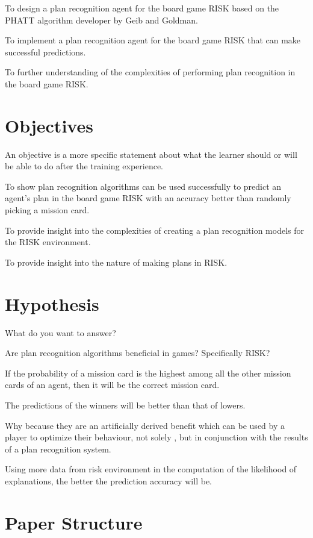 \documentclass[parskip]{cs4rep}
\begin{document}
To design a plan recognition agent for the board game RISK based on the PHATT algorithm developer by Geib and Goldman.

To implement a plan recognition agent for the board game RISK that can make successful predictions.

To further understanding of the complexities of performing plan recognition in the board game RISK.

\section{Objectives}

An objective is a more specific statement about what the learner should or will be able to do after the training experience.

To show plan recognition algorithms can be used successfully to predict an agent's plan in the board game RISK with an accuracy better than randomly picking a mission card.

To provide insight into the complexities of creating a plan recognition models for the RISK environment.

To provide insight into the nature of making plans in RISK. 

\section{Hypothesis}

What do you want to answer?

Are plan recognition algorithms beneficial in games? Specifically RISK?

If the probability of a mission card is the highest among all the other mission cards of an agent, then it will be the correct mission card.

The predictions of the winners will be better than that of lowers.

Why because they are an artificially derived benefit which can be used by a player to optimize their behaviour, not solely , but in conjunction with the results of a plan recognition system.

Using more data from risk environment in the computation of the likelihood of explanations, the better the prediction accuracy will be.

\section{Paper Structure}
\end{document}
